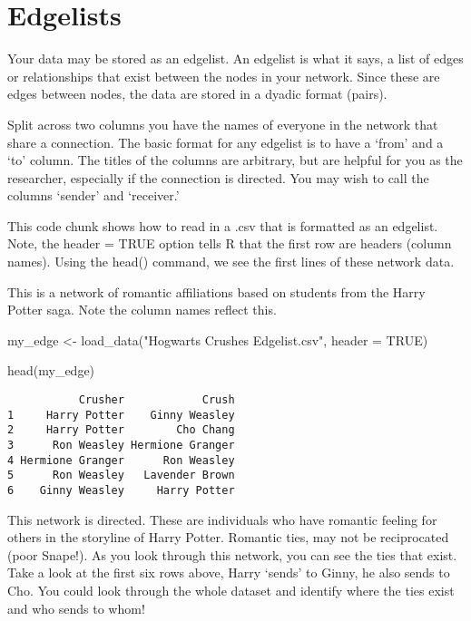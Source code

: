 \documentclass[
  letterpaper,
  DIV=11,
  numbers=noendperiod]{scrreprt}
\newenvironment{Shaded}{\begin{snugshade}}{\end{snugshade}}
\newcommand{\AttributeTok}[1]{\textcolor[rgb]{0.40,0.45,0.13}{#1}}
\newcommand{\ConstantTok}[1]{\textcolor[rgb]{0.56,0.35,0.01}{#1}}
\newcommand{\FunctionTok}[1]{\textcolor[rgb]{0.28,0.35,0.67}{#1}}
\newcommand{\NormalTok}[1]{\textcolor[rgb]{0.00,0.23,0.31}{#1}}
\newcommand{\OtherTok}[1]{\textcolor[rgb]{0.00,0.23,0.31}{#1}}
\newcommand{\StringTok}[1]{\textcolor[rgb]{0.13,0.47,0.30}{#1}}
\begin{document}
\section{Edgelists}\label{edgelists}

Your data may be stored as an edgelist. An edgelist is what it says, a
list of edges or relationships that exist between the nodes in your
network. Since these are edges between nodes, the data are stored in a
dyadic format (pairs).

Split across two columns you have the names of everyone in the network
that share a connection. The basic format for any edgelist is to have a
`from' and a `to' column. The titles of the columns are arbitrary, but
are helpful for you as the researcher, especially if the connection is
directed. You may wish to call the columns `sender' and `receiver.'

This code chunk shows how to read in a .csv that is formatted as an
edgelist. Note, the header = TRUE option tells R that the first row are
headers (column names). Using the head() command, we see the first lines
of these network data.

This is a network of romantic affiliations based on students from the
Harry Potter saga. Note the column names reflect this.

\begin{Shaded}
\begin{Highlighting}[]
\NormalTok{my\_edge }\OtherTok{\textless{}{-}} \FunctionTok{load\_data}\NormalTok{(}\StringTok{"Hogwarts Crushes Edgelist.csv"}\NormalTok{, }\AttributeTok{header =} \ConstantTok{TRUE}\NormalTok{)}

\FunctionTok{head}\NormalTok{(my\_edge)}
\end{Highlighting}
\end{Shaded}

\begin{verbatim}
           Crusher            Crush
1     Harry Potter    Ginny Weasley
2     Harry Potter        Cho Chang
3      Ron Weasley Hermione Granger
4 Hermione Granger      Ron Weasley
5      Ron Weasley   Lavender Brown
6    Ginny Weasley     Harry Potter
\end{verbatim}

This network is directed. These are individuals who have romantic
feeling for others in the storyline of Harry Potter. Romantic ties, may
not be reciprocated (poor Snape!). As you look through this network, you
can see the ties that exist. Take a look at the first six rows above,
Harry `sends' to Ginny, he also sends to Cho. You could look through the
whole dataset and identify where the ties exist and who sends to whom!
\end{document}
